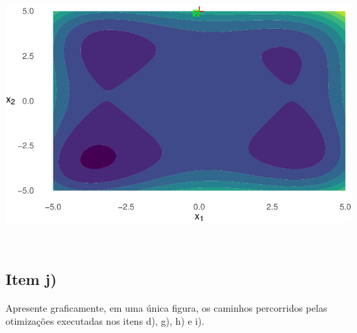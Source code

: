 \documentclass[
  a4paperpaper,
]{article}
\begin{document}
\includegraphics{lista3-resolucao_files/figure-pdf/q1i-1.pdf}

~

\subsection{Item j)}\label{item-j}

Apresente graficamente, em uma única figura, os caminhos percorridos
pelas otimizações executadas nos itens d), g), h) e i).
\end{document}
